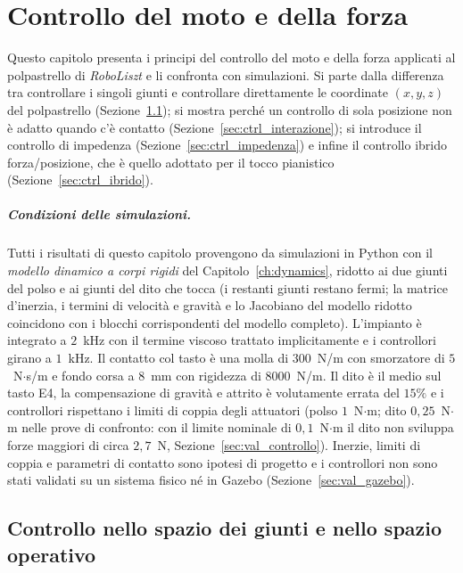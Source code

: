 
\chapter{Controllo del moto e della forza}
\label{ch:controllo}

Questo capitolo presenta i principi del controllo del moto e della forza applicati al polpastrello di \textit{RoboLiszt} e li confronta con simulazioni. Si parte dalla differenza tra controllare i singoli giunti e controllare direttamente le coordinate $(x,y,z)$ del polpastrello (Sezione~\ref{sec:ctrl_spazi}); si mostra perché un controllo di sola posizione non è adatto quando c'è contatto (Sezione~\ref{sec:ctrl_interazione}); si introduce il controllo di impedenza (Sezione~\ref{sec:ctrl_impedenza}) e infine il controllo ibrido forza/posizione, che è quello adottato per il tocco pianistico (Sezione~\ref{sec:ctrl_ibrido}).

\paragraph{Condizioni delle simulazioni.} Tutti i risultati di questo capitolo provengono da simulazioni in Python con il \emph{modello dinamico a corpi rigidi} del Capitolo~\ref{ch:dynamics}, ridotto ai due giunti del polso e ai giunti del dito che tocca (i restanti giunti restano fermi; la matrice d'inerzia, i termini di velocità e gravità e lo Jacobiano del modello ridotto coincidono con i blocchi corrispondenti del modello completo). L'impianto è integrato a $2$~kHz con il termine viscoso trattato implicitamente e i controllori girano a $1$~kHz. Il contatto col tasto è una molla di $300$~N/m con smorzatore di $5$~N$\cdot$s/m e fondo corsa a $8$~mm con rigidezza di $8000$~N/m. Il dito è il medio sul tasto E4, la compensazione di gravità e attrito è volutamente errata del $15\%$ e i controllori rispettano i limiti di coppia degli attuatori (polso $1$~N$\cdot$m; dito $0{,}25$~N$\cdot$m nelle prove di confronto: con il limite nominale di $0{,}1$~N$\cdot$m il dito non sviluppa forze maggiori di circa $2{,}7$~N, Sezione~\ref{sec:val_controllo}). Inerzie, limiti di coppia e parametri di contatto sono ipotesi di progetto e i controllori non sono stati validati su un sistema fisico né in Gazebo (Sezione~\ref{sec:val_gazebo}).

\section{Controllo nello spazio dei giunti e nello spazio operativo}
\label{sec:ctrl_spazi}

